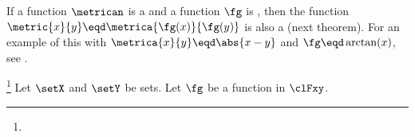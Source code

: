 If a function $\metrican$ is a  and a function $\fg$ is , then 
the function $\metric{x}{y}\eqd\metrica{\fg(x)}{\fg(y)}$ is also a  (next theorem).
For an example of this with $\metrica{x}{y}\eqd\abs{x-y}$ and $\fg\eqd\arctan(x)$, see .

\begin{theorem}
\label{thm:met_sumpf}
\footnote{
  }
Let $\setX$ and $\setY$ be sets.
Let $\fg$ be a function in $\clFxy$.
\end{theorem}
